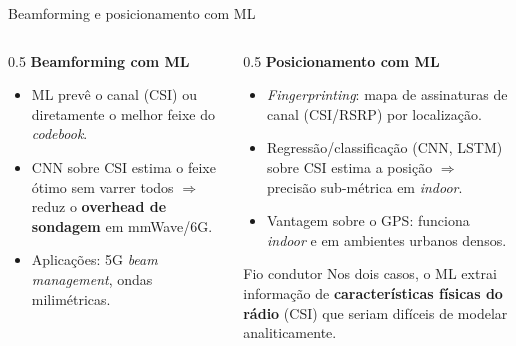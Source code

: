 \documentclass[aspectratio=169,11pt]{beamer}
\begin{document}
\begin{frame}{Beamforming e posicionamento com ML}
  \begin{columns}
    \begin{column}{0.5\textwidth}
      \textbf{Beamforming com ML}
      \begin{itemize}
        \item ML prevê o canal (CSI) ou diretamente o melhor feixe do \emph{codebook}.
        \item CNN sobre CSI estima o feixe ótimo sem varrer todos $\Rightarrow$ reduz o \textbf{overhead de sondagem} em mmWave/6G.
        \item Aplicações: 5G \emph{beam management}, ondas milimétricas.
      \end{itemize}
    \end{column}
    \begin{column}{0.5\textwidth}
      \textbf{Posicionamento com ML}
      \begin{itemize}
        \item \emph{Fingerprinting}: mapa de assinaturas de canal (CSI/RSRP) por localização.
        \item Regressão/classificação (CNN, LSTM) sobre CSI estima a posição $\Rightarrow$ precisão sub-métrica em \emph{indoor}.
        \item Vantagem sobre o GPS: funciona \emph{indoor} e em ambientes urbanos densos.
      \end{itemize}
      \begin{exampleblock}{Fio condutor}
        Nos dois casos, o ML extrai informação de \textbf{características físicas do rádio} (CSI) que seriam difíceis de modelar analiticamente.
      \end{exampleblock}
    \end{column}
  \end{columns}
\end{frame}
\end{document}
